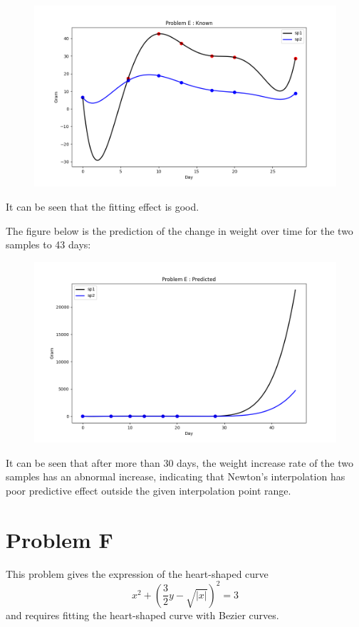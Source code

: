 \documentclass[a4paper]{article}
\begin{document}
\begin{figure}[h]
    \centering
    \includegraphics[width=0.75\linewidth]{Pictures/ProblemE_figure_Known.png}
    \label{fig:enter-label}
\end{figure}

It can be seen that the fitting effect is good.

\newpage
The figure below is the prediction of the change in weight over time for the two samples to 43 days:

\begin{figure}[h]
    \centering
    \includegraphics[width=0.75\linewidth]{Pictures/ProblemE_figure_Predicted.png}
    \label{fig:enter-label}
\end{figure}

It can be seen that after more than 30 days, the weight increase rate of the two samples has an abnormal increase, indicating that Newton's interpolation has poor predictive effect outside the given interpolation point range.


\section*{Problem F}

This problem gives the expression of the heart-shaped curve
\[
    x^2 + \left(\frac{3}{2}y - \sqrt{|x|}\right)^2 = 3
\]
and requires fitting the heart-shaped curve with Bezier curves.
\end{document}
